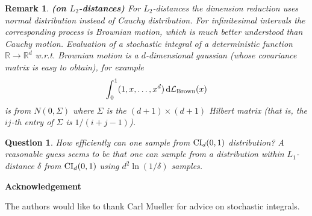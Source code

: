 \documentclass[11pt]{article}
\def\R{{\mathbb R}}
\newtheorem{rem}[thm]{Remark}
\newtheorem{que}[thm]{Question}
\def\BQUE{\begin{que}}
\def\EQUE{\end{que}}
\def\BREM{\begin{rem}\rm}
\def\EREM{\end{rem}}
\begin{document}
\BREM{\bf (on $L_2$-distances)}
For $L_2$-distances the dimension reduction uses normal distribution instead of Cauchy distribution.
For infinitesimal intervals the corresponding process is Brownian
motion, which is much better understood than Cauchy motion. Evaluation of a stochastic
integral of a deterministic function $\R\rightarrow\R^d$ w.r.t. Brownian motion is a
$d$-dimensional gaussian (whose covariance matrix is easy to obtain), for example
$$
\int_0^1(1,x,\dots,x^{d})\,{\rm d}{\cal L}_{\rm Brown}(x)
$$
is from $N(0,\Sigma)$ where $\Sigma$ is the $(d+1)\times (d+1)$ Hilbert matrix (that
is, the $ij$-th entry of $\Sigma$ is $1/(i+j-1)$).
\EREM

\BQUE
How efficiently can one sample from ${\rm CI}_d(0,1)$ distribution? A reasonable
guess seems to be that one can sample from a distribution within $L_1$-distance
$\delta$ from ${\rm CI}_d(0,1)$ using $d^2\ln(1/\delta)$ samples.
\EQUE

\vskip 0.2cm
\noindent
{\bf\Large Acknowledgement}

\vskip 0.2cm
\noindent
The authors would like to thank Carl Mueller for advice on stochastic integrals.
\end{document}
